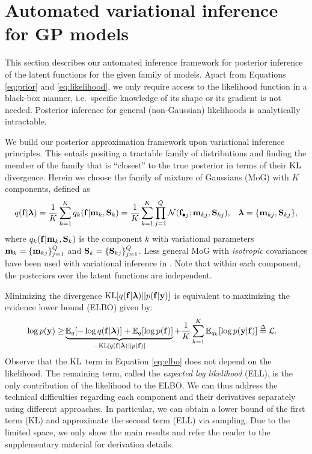 \section{Automated variational inference for GP models}
This section describes our automated inference framework 
for posterior inference of the latent functions 
for the given family of models.
%
Apart from Equations \eqref{eq:prior} and \eqref{eq:likelihood},
we only require access to the likelihood function 
in a black-box manner, i.e.~specific knowledge of 
its shape or its gradient is not needed. 
Posterior inference for general (non-Gaussian) likelihoods is analytically 
intractable. 

We build our posterior approximation framework upon variational inference principles.  
This entails positing a tractable family of distributions and finding the member of the family that is 
``closest'' to the true posterior in terms of their $\KL$ divergence.
Herein we choose the family of mixture of Gaussians (MoG) with $K$  components, defined as 
\begin{align}
q(\f | \llambda) = \frac{1}{K}  \sum_{k=1}^K q_k(\f | \m_k, \S_k ) =  \frac{1}{K}  \sum_{k=1}^K \prod_{j=1}^Q 
\Normal(\fj; \m_{kj}, \S_{kj}) \text{,} 
\quad \llambda = \{ \m_{kj}, \S_{kj} \} \text{,}
\end{align}
where $q_k(\f | \m_k, \S_k)$ is the component $k$ with variational parameters 
$\m_k =  \{ \m_{kj}\}_{j=1}^{Q}$ and $\S_k = \{\S_{kj} \}_{j=1}^{Q}$. 
Less general MoG with \emph{isotropic} covariances have been used with variational inference in \cite{nguyen2013efficient,gershman-et-al-icml-12}.
Note that within each component, the posteriors over the latent functions are independent.

Minimizing the divergence $\KL[q(\f | \llambda) || p(\f|\y)]$ is equivalent to maximizing the evidence lower bound (ELBO) given by:
\begin{align}
\label{eq:elbo}
\log p(\y) 
\geq & 
\underbrace{\expectation_q [ - \log q(\f | \llambda)] + 
\expectation_q  [\log p(\f)]}_{-\KL[q(\f | \llambda) || p(\f)]} + 
\frac{1}{K} \sum_{k=1}^K \expectation_{q_k}  [\log p(\y | \f)]
\define \calL \text{.}
\end{align}
Observe that the $\KL$ term  in Equation \eqref{eq:elbo} does not depend on the likelihood.
The remaining term, called the \textit{expected log likelihood} (ELL), is the only contribution of the likelihood to the ELBO. 
We can thus address the technical difficulties regarding each component and their 
derivatives  separately using different approaches.
In particular, we can obtain a lower bound of the first term (KL) and 
approximate the second term (ELL) via sampling.
Due to the limited space, we only show the main results and refer the reader to 
 the supplementary material for derivation details.
%
